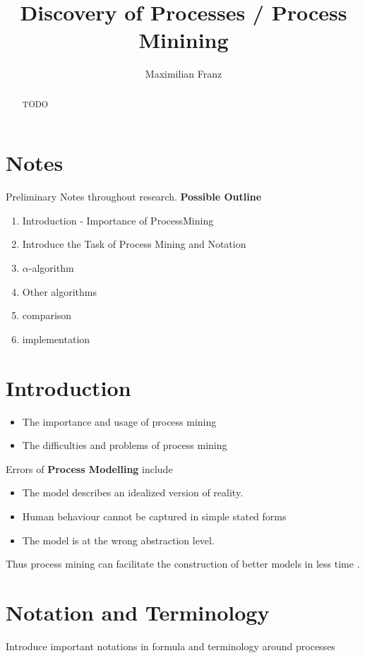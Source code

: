 \documentclass[a4paper]{IEEEtran}
\title{Discovery of Processes / Process Minining}
\author{Maximilian Franz}
\begin{document}
\maketitle

\begin{abstract}
TODO
\end{abstract}

\section{Notes}
Preliminary Notes throughout research. \newline
\textbf{Possible Outline}
\begin{enumerate}
\item Introduction - Importance of ProcessMining
    \item Introduce the Task of Process Mining and Notation
    \item $\alpha$-algorithm
    \item Other algorithms
    \item comparison 
    \item implementation 
\end{enumerate}

\section{Introduction}
\begin{itemize}
    \item The importance and usage of process mining 
    \item The difficulties and problems of process mining
\end{itemize}
Errors of \textbf{Process Modelling} include
\begin{itemize}
    \item The model describes an idealized version of reality.
    \item Human behaviour cannot be captured in simple stated forms
    \item The model is at the wrong abstraction level. 
\end{itemize}
Thus process mining can facilitate the construction of better models in less time \cite{process_mining}. \newline

\section{Notation and Terminology}
Introduce important notations in formula and terminology around processes
\end{document}
